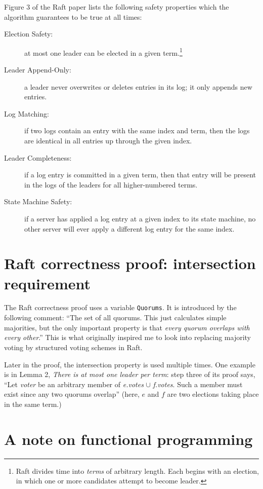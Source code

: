 \documentclass[12pt,chapterprefix=true,toc=bibliography,numbers=noendperiod,
               footnotes=multiple,twoside]{scrreprt}
\begin{document}
Figure 3 of the Raft paper lists the following safety properties which the algorithm guarantees to be true at all times:\autocite{raft}

\begin{description}
    \item[Election Safety:] at most one leader can be elected in a given term.\footnote{Raft divides time into \emph{terms} of arbitrary length. Each begins with an election, in which one or more candidates attempt to become leader.}
    \item[Leader Append-Only:] a leader never overwrites or deletes entries in its log; it only appends new entries.
    \item[Log Matching:] if two logs contain an entry with the same index and term, then the logs are identical in all entries up through the given index.
    \item[Leader Completeness:] if a log entry is committed in a given term, then that entry will be present in the logs of the leaders for all higher-numbered terms.
    \item[State Machine Safety:] if a server has applied a log entry at a given index to its state machine, no other server will ever apply a different log entry for the same index.
\end{description}

\section{Raft correctness proof: intersection requirement}
\label{sc:rafter-proof}

The Raft correctness proof uses a variable \texttt{Quorums}. It is introduced by the following comment: \enquote{The set of all quorums. This just calculates simple majorities, but the only important property is that \emph{every quorum overlaps with every other}.} This is what originally inspired me to look into replacing majority voting by structured voting schemes in Raft.

Later in the proof, the intersection property is used multiple times. One example is in Lemma 2, \emph{There is at most one leader per term}: step three of its proof says, \enquote{Let \textit{voter} be an arbitrary member of \textit{e.votes} \(\cup\) \textit{f.votes}. Such a member must exist since any two quorums overlap} (here, \(e\) and \(f\) are two elections taking place in the same term.)

\section{A note on functional programming}
\label{sc:fp-note}
\end{document}
